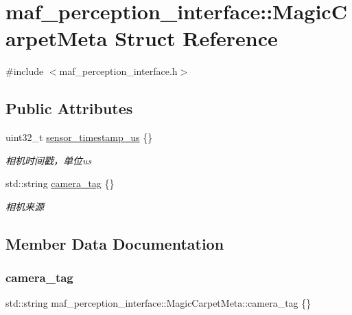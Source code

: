 \hypertarget{structmaf__perception__interface_1_1MagicCarpetMeta}{}\section{maf\+\_\+perception\+\_\+interface\+:\+:Magic\+Carpet\+Meta Struct Reference}
\label{structmaf__perception__interface_1_1MagicCarpetMeta}


{\ttfamily \#include $<$maf\+\_\+perception\+\_\+interface.\+h$>$}

\subsection*{Public Attributes}
\begin{DoxyCompactItemize}
\item 
uint32\+\_\+t \hyperlink{structmaf__perception__interface_1_1MagicCarpetMeta_a6fb076bf07f0c295e7d255e3c076d2c7}{sensor\+\_\+timestamp\+\_\+us} \{\}
\begin{DoxyCompactList}\small\item\em 相机时间戳，单位us \end{DoxyCompactList}\item 
std\+::string \hyperlink{structmaf__perception__interface_1_1MagicCarpetMeta_a0f61e37abb59fa6a85293e9517afa353}{camera\+\_\+tag} \{\}
\begin{DoxyCompactList}\small\item\em 相机来源 \end{DoxyCompactList}\end{DoxyCompactItemize}


\subsection{Member Data Documentation}
\mbox{\label{structmaf__perception__interface_1_1MagicCarpetMeta_a0f61e37abb59fa6a85293e9517afa353}} 
\subsubsection{\texorpdfstring{camera\+\_\+tag}{camera\_tag}}
{\footnotesize\ttfamily std\+::string maf\+\_\+perception\+\_\+interface\+::\+Magic\+Carpet\+Meta\+::camera\+\_\+tag \{\}}



